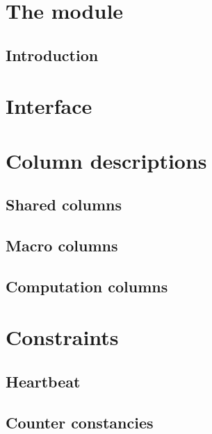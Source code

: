 
\section{The \rlpUtilsMod{} module}
\subsection{Introduction}                    \label{rlp utils: introduction}                          

\section{Interface}			                   \label{rlp utils: rlp* / rlp utils interface}          

\section{Column descriptions}                \label{rlp utils: column descriptions}                   
\subsection{Shared columns}                                                                           
\subsection{Macro columns}                                                                            
\subsection{Computation columns}                                                                      

\section{Constraints}                        \label{rlp utils: constraints}
\subsection{Heartbeat}                       \label{rlp utils: constraints: heartbeat}                
\subsection{Counter constancies}             \label{rlp utils: constraints: constancies}              
